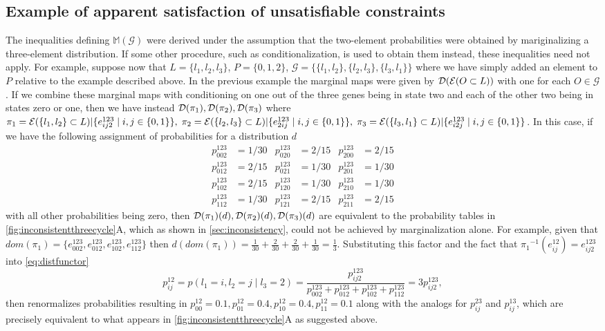 \subsection{Example of apparent satisfaction of unsatisfiable constraints}\label{sec:apparentinconsistency}
The inequalities defining $\mathbb{M}(\mathcal{G})$ were derived under the assumption that the two-element probabilities were obtained by mariginalizing a three-element distribution.  If some other procedure, such as conditionalization, is used to obtain them instead, these inequalities need not apply. For example, suppose now that $L = \{l_1,l_2,l_3 \}$, $P = \{0,1,2\}$, $\mathcal{G} = \{\{l_1,l_2\},\{l_2,l_3\},\{l_3,l_1\}\}$ where we have simply added an element to $P$ relative to the example described above. In the previous example the marginal maps were given by $\mathcal{D} (\mathcal{E} (O \subset L))$ with one for each $O \in \mathcal{G}$. If we combine these marginal maps with conditioning on one out of the three genes being in state two and each of the other two being in states zero or one, then we have instead $\mathcal{D} (\pi_1), \mathcal{D} (\pi_2), \mathcal{D} (\pi_3)$ where $\pi_1 = \mathcal{E} (\{l_1,l_2\} \subset L)|\{ e^{123}_{ij2} \mid i,j \in \{ 0,1 \} \},\; \pi_2 = \mathcal{E} (\{l_2,l_3\} \subset L)|\{ e^{123}_{2ij} \mid i,j \in \{ 0,1 \} \},\; \pi_3 = \mathcal{E} (\{l_3,l_1\} \subset L)|\{ e^{123}_{i2j} \mid i,j \in \{ 0,1 \} \}$. In this case, if we have the following assignment of probabilities for a distribution $d$
\begin{equation}\label{eq:condprobs}
\begin{aligned}
p^{123}_{002} &= 1/30 & p^{123}_{020} &= 2/15 & p^{123}_{200} &= 2/15\\
p^{123}_{012} &= 2/15 & p^{123}_{021} &= 1/30 & p^{123}_{201} &= 1/30\\
p^{123}_{102} &= 2/15 & p^{123}_{120} &= 1/30 & p^{123}_{210} &= 1/30\\
p^{123}_{112} &= 1/30 & p^{123}_{121} &= 2/15 & p^{123}_{211} &= 2/15
\end{aligned}
\end{equation}
with all other probabilities being zero, then $\mathcal{D} (\pi_1)(d), \mathcal{D} (\pi_2)(d), \mathcal{D} (\pi_3)(d)$ are equivalent to the probability tables in \ref{fig:inconsistentthreecycle}A, which as shown in \ref{sec:inconsistency}, could not be achieved by marginalization alone. For example, given that $dom(\pi_1) = \{ e^{123}_{002}, e^{123}_{012}, e^{123}_{102}, e^{123}_{112} \}$ then $d(dom(\pi_1)) = \frac{1}{30} + \frac{2}{30} + \frac{2}{30} + \frac{1}{30} = \frac{1}{3}$. Substituting this factor and the fact that ${\pi_1}^{-1}(e^{12}_{ij}) = e^{123}_{ij2}$ into \ref{eq:distfunctor}
$$
p^{12}_{ij} = p(l_1 = i , l_2 = j \mid l_3 = 2) = \frac{p^{123}_{ij2}}{p^{123}_{002}+p^{123}_{012}+p^{123}_{102}+p^{123}_{112}} = 3 p^{123}_{ij2},
$$
then renormalizes probabilities resulting in $p^{12}_{00} = 0.1, p^{12}_{01} = 0.4, p^{12}_{10} = 0.4, p^{12}_{11} = 0.1$ along with the analogs for $p^{23}_{ij}$ and $p^{13}_{ij}$, which are precisely equivalent to what appears in \ref{fig:inconsistentthreecycle}A as suggested above.


